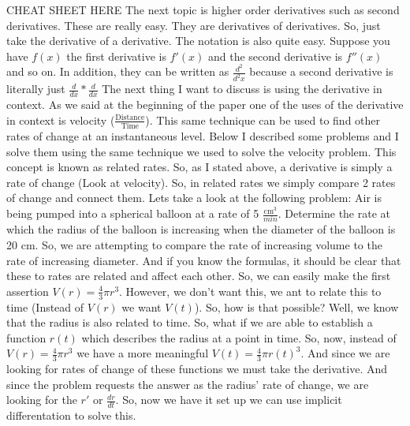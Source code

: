 \documentclass{article}
\begin{document}
\newline
\newline
CHEAT SHEET HERE
\newline
\newline
The next topic is higher order derivatives such as second derivatives. These are really easy. They are derivatives of derivatives. So, just take the derivative of a derivative. The notation is also quite easy. Suppose you have $f(x)$ the first derivative is $f'(x)$ and the second derivative is $f''(x)$ and so on. In addition, they can be written as $\frac{d^2}{d^2x}$ because a second derivative is literally just $\frac{d}{dx} * \frac{d}{dx}$
\newline
\newline
The next thing I want to discuss is using the derivative in context. As we said at the beginning of the paper one of the uses of the derivative in context is velocity ($\frac{\text{Distance}}{\text{Time}}$). This same technique can be used to find other rates of change at an instantaneous level. Below I described some problems and I solve them using the same technique we used to solve the velocity problem. This concept is known as related rates.
\newline
\newline
So, as I stated above, a derivative is simply a rate of change (Look at velocity). So, in related rates we simply compare 2 rates of change and connect them. Lets take a look at the following problem:
\newline
Air is being pumped into a spherical balloon at a rate of 5 $\frac{\text{cm}^3}{min}$. Determine the rate at which the radius of the balloon is increasing when the diameter of the balloon is 20 cm.
\newline
\newline
So, we are attempting to compare the rate of increasing volume to the rate of increasing diameter. And if you know the formulas, it should be clear that these to rates are related and affect each other. So, we can easily make the first assertion $V(r) = \frac{4}{3}\pi r^3$. However, we don't want this, we ant to relate this to time (Instead of $V(r)$ we want $V(t)$). So, how is that possible? Well, we know that the radius is also related to time. So, what if we are able to establish a function $r(t)$ which describes the radius at a point in time. So, now, instead of $V(r) = \frac{4}{3}\pi r^3$ we have a more meaningful $V(t) = \frac{4}{3}\pi r(t)^3$. And since we are looking for rates of change of these functions we must take the derivative. And since the problem requests the answer as the radius' rate of change, we are looking for the $r'$ or  $\frac{dr}{dt}$. So, now we have it set up we can use implicit differentation to solve this.
\end{document}
